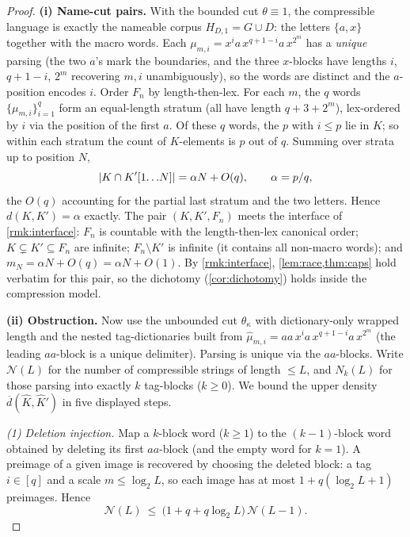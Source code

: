\documentclass[11pt]{article}
\numberwithin{equation}{section}
\DeclarePairedDelimiter{\abs}{\lvert}{\rvert}
\newcommand{\Comp}[1]{H_{#1}}
\newcommand{\dup}[2]{\overline{d}(#1,#2)}
\newcommand{\dens}[2]{d(#1,#2)}
\newcommand{\rest}[2]{#1[1\!\dots\! #2]}
\theoremstyle{plain}
\theoremstyle{definition}
\theoremstyle{remark}
\begin{document}
\begin{statementbox}
\PropFree*
\end{statementbox}
\begin{proof}
\medskip\noindent\textbf{(i) Name-cut pairs.}\quad
With the bounded cut $\theta \equiv 1$, the compressible language is exactly the nameable
corpus $\Comp{D,1} = G \cup D$: the letters $\{a, x\}$ together with the macro words. Each
$\mu_{m,i} = x^i a\, x^{q+1-i} a\, x^{2^m}$ has a \emph{unique} parsing (the two $a$'s mark
the boundaries, and the three $x$-blocks have lengths $i$, $q+1-i$, $2^m$ recovering $m, i$
unambiguously), so the words are distinct and the $a$-position encodes $i$. Order $F_n$ by
length-then-lex. For each $m$, the $q$ words $\{\mu_{m,i}\}_{i=1}^q$ form an equal-length
stratum (all have length $q + 3 + 2^m$), lex-ordered by $i$ via the position of the first $a$.
Of these $q$ words, the $p$ with $i \le p$ lie in $K$; so within each stratum the count of
$K$-elements is $p$ out of $q$. Summing over strata up to position $N$,
\begin{equation*}
  \abs{K \cap \rest{K'}{N}} = \alpha N + O(q),
  \qquad \alpha = p/q,
\end{equation*}
the $O(q)$ accounting for the partial last stratum and the two letters. Hence $\dens{K}{K'} =
\alpha$ exactly. The pair $(K, K', F_n)$ meets the interface of \cref{rmk:interface}: $F_n$ is
countable with the length-then-lex canonical order; $K \subsetneq K' \subseteq F_n$ are
infinite; $F_n \setminus K'$ is infinite (it contains all non-macro words); and $m_N = \alpha
N + O(q) = \alpha N + O(1)$. By \cref{rmk:interface}, \cref{lem:race,thm:caps} hold verbatim
for this pair, so the dichotomy (\cref{cor:dichotomy}) holds inside the compression model.

\medskip\noindent\textbf{(ii) Obstruction.}\quad
Now use the unbounded cut $\theta_\kappa$ with dictionary-only wrapped length and the nested
tag-dictionaries built from $\hat\mu_{m,i} = a a\, x^i a\, x^{q+1-i} a\, x^{2^m}$ (the leading
$aa$-block is a unique delimiter). Parsing is unique via the $aa$-blocks. Write $\mathcal
N(L)$ for the number of compressible strings of length $\le L$, and $N_k(L)$ for those parsing
into exactly $k$ tag-blocks ($k \ge 0$). We bound the upper density $\dup{\hat K}{\hat K'}$ in
five displayed steps.

\emph{(1) Deletion injection.} Map a $k$-block word ($k \ge 1$) to the $(k-1)$-block word
obtained by deleting its first $aa$-block (and the empty word for $k = 1$). A preimage of a
given image is recovered by choosing the deleted block: a tag $i \in [q]$ and a scale $m \le
\log_2 L$, so each image has at most $1 + q(\log_2 L + 1)$ preimages. Hence
\begin{equation}\label{eq:delinj}
  \mathcal N(L) \ \le\ \bigl(1 + q + q\log_2 L\bigr)\,\mathcal N(L-1).
\end{equation}


\end{proof}
\end{document}
